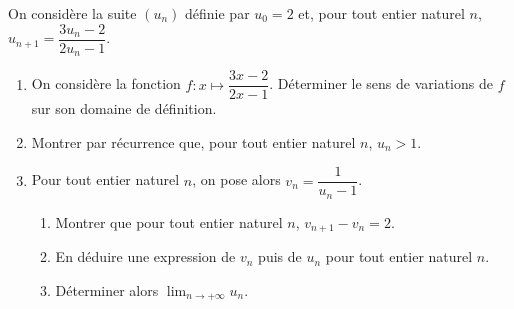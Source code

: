 \documentclass[11pt,fleqn]{book} %
\begin{document}
\begin{exercise}On considère la suite $(u_n)$ définie par $u_0=2$ et, pour tout entier naturel $n$, $u_{n+1}=\dfrac{3u_n-2}{2u_n-1}$.

\begin{enumerate}
\item On considère la fonction $f: x\mapsto \dfrac{3x-2}{2x-1}$. Déterminer le sens de variations de $f$ sur son domaine de définition.
\item Montrer par récurrence que, pour tout entier naturel $n$, $u_n>1$.

\item Pour tout entier naturel $n$, on pose alors $v_n= \dfrac{1}{u_n-1}$.
\begin{enumerate}
\item Montrer que pour tout entier naturel $n$, $v_{n+1}-v_n=2$.
\item En déduire une expression de $v_n$ puis de $u_n$ pour tout entier naturel $n$.
\item Déterminer alors $\displaystyle\lim_{n \to +\infty}u_n$.
\end{enumerate}\end{enumerate}\end{exercise}
\end{document}
